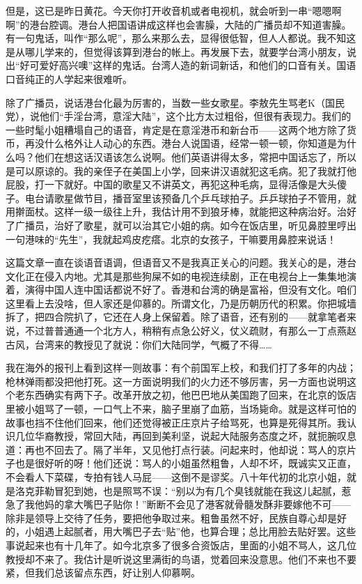 但是，这已是昨日黄花。今天你打开收音机或者电视机，就会听到一串“嗯嗯啊啊”的港台腔调。港台人把国语讲成这样也会害臊，大陆的广播员却不知道害臊。有一句鬼话，叫作“那么呢”，那么来那么去，显得很低智，但人人都说。我不知这是从哪儿学来的，但觉得该算到港台的帐上。再发展下去，就要学台湾小朋友，说出“好可爱好高兴噢”这样的鬼话。台湾人造的新词新话，和他们的口音有关。国语口音纯正的人学起来很难听。 

除了广播员，说话港台化最为厉害的，当数一些女歌星。李敖先生骂老K（国民党），说他们“手淫台湾，意淫大陆”，这个比方太过粗俗，但很有表现力。我们的一些时髦小姐糟塌自己的语音，肯定是在意淫港币和新台币——这两个地方除了货币，再没什么格外让人动心的东西。港台人说国语，经常一顿一顿，你知道是为什么吗？他们在想这话汉语该怎么说啊。他们英语讲得太多，常把中国话忘了，所以是可以原谅的。我的亲侄子在美国上小学，回来讲汉语就犯这毛病。犯了我就打他屁股，打一下就好。中国的歌星又不讲英文，再犯这种毛病，显得活像是大头傻子。电台请歌星做节目，播音室里该预备几个乒乓球拍子。乒乒球拍子不管用，就用擀面杖。这样一级一级往上升，我估计用不到狼牙棒，就能把这种病治好。治好了广播员，治好了歌星，就可以治其它小姐的病。如今在饭店里，听见鼻腔里哼出一句港味的“先生”，我就起鸡皮疙瘩。北京的女孩子，干嘛要用鼻腔来说话！ 

这篇文章一直在谈语音语调，但语音又不是我真正关心的问题。我关心的是，港台文化正在侵入内地。尤其是那些狗屎不如的电视连续剧，正在电视台上一集集地演着，演得中国人连中国话都说不好了。香港和台湾的确是富裕，但没有文化。咱们这里看上去没啥，但人家还是仰慕的。所谓文化，乃是历朝历代的积累。你把城墙拆了，把四合院扒了，它还在人身上保留着。除了语音，还有别的——就拿笔者来说，不过普普通通一个北方人，稍稍有点急公好义，仗义疏财，有那么一丁点燕赵古风，台湾来的教授见了就说：你们大陆同学，气概了不得…… 

我在海外的报刊上看到这样一则故事：有个前国军上校，和我们打了多年的内战；枪林弹雨都没把他打死。这一方面说明我们的火力还不够厉害，另一方面也说明这个老东西确实有两下子。改革开放之初，他巴巴地从美国跑了回来，在北京的饭店里被小姐骂了一顿，一口气上不来，脑子里崩了血筋，当场毙命。就是这样可怕的故事也挡不住他们回来，他们还觉得被正庄京片子给骂死，也算是死得其所。我认识几位华裔教授，常回大陆，再回到美利坚，说起大陆服务态度之坏，就扼腕叹息道：再也不回去了。隔了半年，又见他打点行装。问起来时，他却说：骂人的京片子也是很好听的呀！他们还说：骂人的小姐虽然粗鲁，人却不坏，既诚实又正直，不会看人下菜碟，专拍有钱人马屁——这倒不是谬奖。八十年代初的北京小姐，就是洛克菲勒冒犯到她，也是照骂不误：“别以为有几个臭钱就能在我这儿起腻，惹急了我他妈的拿大嘴巴子贴你！”断断不会见了港客就骨髓发酥非要嫁他不可——除非是领导上交待了任务，要把他争取过来。粗鲁虽然不好，民族自尊心却是好的，小姐遇上起腻者，用大嘴巴子去“贴”他，也算合理；总比用脸去贴好罢。这些事说起来也有十几年了。如今北京多了很多合资饭店，里面的小姐不骂人，这几位教授却不来了。我估计是听说这里满街的鸟语，觉着回来没意思。他们不来也不要紧，但我们总该留点东西，好让别人仰慕啊。

